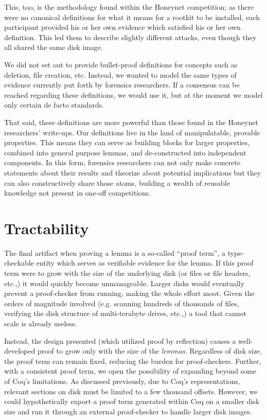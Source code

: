 \documentclass[nocopyrightspace,preprint]{sigplanconf}
\begin{document}
This, too, is the methodology found within the Honeynet competition; as there
were no canonical definitions for what it means for a rootkit to be installed,
each participant provided his or her own evidence which satisfied his or her
own definition. This led them to describe slightly different attacks, even
though they all shared the same disk image.

We did not set out to provide bullet-proof definitions for concepts such as
deletion, file creation, etc. Instead, we wanted to model the same types of
evidence currently put forth by forensics researchers. If a consensus can be
reached regarding these definitions, we would use it, but at the moment we
model only certain de facto standards.

That said, these definitions are more powerful than those found in the
Honeynet researchers' write-ups. Our definitions live in the land of
manipulatable, provable properties. This means they can serve as building
blocks for larger properties, combined into general purpose lemmas, and
de-constructed into independent components. In this form, forensics
researchers can not only make concrete statements about their results and
theorize about potential implications but they can also constructively share
those atoms, building a wealth of reusable knowledge not present in one-off
competitions.

\section{Tractability}

The final artifact when proving a lemma is a so-called ``proof term'', a
type-checkable entity which serves as verifiable evidence for the lemma. If
this proof term were to grow with the size of the underlying disk (or files or
file headers, etc.,) it would quickly become unmanageable. Larger disks would
eventually prevent a proof-checker from running, making the whole effort moot.
Given the orders of magnitude involved (e.g. scanning hundreds of thousands of
files, verifying the disk structure of multi-terabyte drives, etc.,) a tool
that cannot scale is already useless.

Instead, the design presented (which utilized proof by reflection) causes a
well-developed proof to grow only with the size of the {\em lemmas}.
Regardless of disk size, the proof term can remain fixed, reducing the
burden for proof-checkers. Further, with a consistent proof term, we open the
possibility of expanding beyond some of Coq's limitations. As discussed
previously, due to Coq's representations, relevant sections on disk must be
limited to a few thousand offsets. However, we could hypothetically export a
proof term generated within Coq on a smaller disk size and run it through an
external proof-checker to handle larger disk images.
\end{document}
